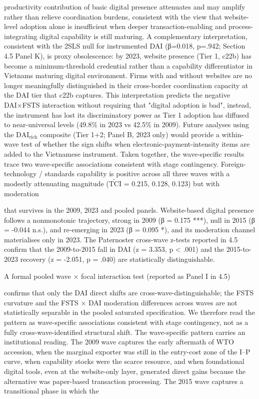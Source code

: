 \documentclass[12pt,a4paper]{article}
\begin{document}
productivity contribution of basic digital presence attenuates and may
amplify rather than relieve coordination burdens, consistent with the
view that website-level adoption alone is insufficient when deeper
transaction-enabling and process-integrating digital capability is still
maturing. A complementary interpretation, consistent with the 2SLS null
for instrumented DAI (β=0.018, p=.942; Section 4.5 Panel K), is proxy
obsolescence: by 2023, website presence (Tier 1, c22b) has become a
minimum-threshold credential rather than a capability differentiator in
Vietnam\textquotesingle s maturing digital environment. Firms with and
without websites are no longer meaningfully distinguished in their
cross-border coordination capacity at the DAI tier that c22b captures.
This interpretation predicts the negative DAI×FSTS interaction without
requiring that "digital adoption is bad", instead, the instrument has
lost its discriminatory power as Tier 1 adoption has diffused to
near-universal levels (49.8\% in 2023 vs 42.5\% in 2009). Future
analyses using the \(\mathrm{DAI}_{\text{rich}}\) composite (Tier 1+2;
Panel B, 2023 only) would provide a within-wave test of whether the sign
shifts when electronic-payment-intensity items are added to the
Vietnamese instrument. Taken together, the wave-specific results trace
two wave-specific associations consistent with stage contingency.
Foreign-technology / standards capability is positive across all three
waves with a modestly attenuating magnitude (\(\tilde{\mathrm{TCI}}\) =
0.215, 0.128, 0.123) but with moderation

that survives in the 2009, 2023 and pooled panels. Website-based digital
presence follows a nonmonotonic trajectory, strong in 2009 (β = 0.175
***), null in 2015 (β = -0.044 n.s.), and re-emerging in 2023 (β = 0.095
*), and its moderation channel materialises only in 2023. The
Paternoster cross-wave z-tests reported in 4.5 confirm that the
2009-to-2015 fall in DAI (z = 3.353, p \textless{} .001) and the
2015-to-2023 recovery (z = -2.051, p = .040) are statistically
distinguishable.

A formal pooled wave × focal interaction test (reported as Panel I in
4.5)

confirms that only the DAI direct shifts are cross-wave-distinguishable;
the FSTS curvature and the FSTS × DAI moderation differences across
waves are not statistically separable in the pooled saturated
specification. We therefore read the pattern as wave-specific
associations consistent with stage contingency, not as a fully
cross-wave-identified structural shift. The wave-specific pattern
carries an institutional reading. The 2009 wave captures the early
aftermath of WTO accession, when the marginal exporter was still in the
entry-cost zone of the I--P curve, when capability stocks were the
scarce resource, and when foundational digital tools, even at the
website-only layer, generated direct gains because the alternative was
paper-based transaction processing. The 2015 wave captures a
transitional phase in which the
\end{document}
